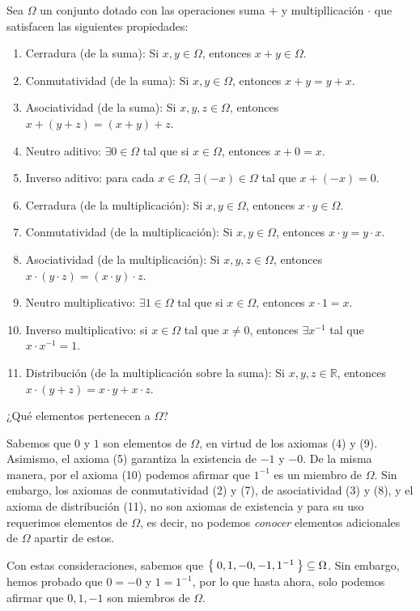 \documentclass[11pt]{article}
\newcommand{\R}{\mathbb{R}}
\newcommand{\defined}{\coloneqq}
\let\set\Set
\let\subset\subseteq
\begin{document}
Sea $\Omega$ un conjunto dotado con las operaciones suma $+$ y multipllicación $\cdot$ que satisfacen las siguientes propiedades:
\begin{enumerate}
\item Cerradura (de la suma): Si $x,y\in \Omega$, entonces $x+y\in \Omega$.
\item Conmutatividad (de la suma): Si $x,y\in \Omega$, entonces $x+y=y+x$.
\item Asociatividad (de la suma): Si $x,y,z \in \Omega$, entonces $x+(y+z)=(x+y)+z$.
\item Neutro aditivo: $\exists 0 \in \Omega$ tal que si $x\in \Omega$, entonces $x+0=x$.
\item Inverso aditivo: para cada $x\in \Omega$, $\exists (-x)\in \Omega$ tal que $x+(-x)=0$.
\item Cerradura (de la multiplicación): Si $x,y\in \Omega$, entonces $x\cdot y \in \Omega$.
\item Conmutatividad (de la multiplicación): Si $x,y\in \Omega$, entonces $x\cdot y = y\cdot x$.
\item Asociatividad (de la multiplicación): Si $x,y,z \in \Omega$, entonces $x\cdot (y\cdot z)=(x\cdot y)\cdot z$.
\item Neutro multiplicativo: $\exists 1\in \Omega$ tal que si $x\in \Omega$, entonces $x\cdot 1=x$.
\item Inverso multiplicativo: si $x\in \Omega$ tal que $x\neq 0$, entonces $\exists x^{-1}$ tal que $x\cdot x^{-1}=1$.
\item Distribución (de la multiplicación sobre la suma): Si $x,y,z\in \R$, entonces $x\cdot(y+z)=x\cdot y+x\cdot z$.
\end{enumerate}

¿Qué elementos pertenecen a $\Omega$?

Sabemos que $0$ y $1$ son elementos de $\Omega$, en virtud de los axiomas (4) y (9). Asimismo, el axioma (5) garantiza la existencia de $-1$ y $-0$. De la misma manera, por el axioma (10) podemos afirmar que $1^{-1}$ es un miembro de $\Omega$. Sin embargo, los axiomas de conmutatividad (2) y (7), de asociatividad (3) y (8), y el axioma de distribución (11), no son axiomas de existencia y para su uso requerimos elementos de $\Omega$, es decir, no podemos \textit{conocer} elementos adicionales de $\Omega$ apartir de estos.

Con estas consideraciones, sabemos que $\set{0,1,-0,-1,1^{-1}}\subset \Omega$. Sin embargo, hemos probado que $0=-0$ y $1=1^{-1}$, por lo que hasta ahora, solo podemos afirmar que $0,1,-1$ son miembros de $\Omega$.
\end{document}
